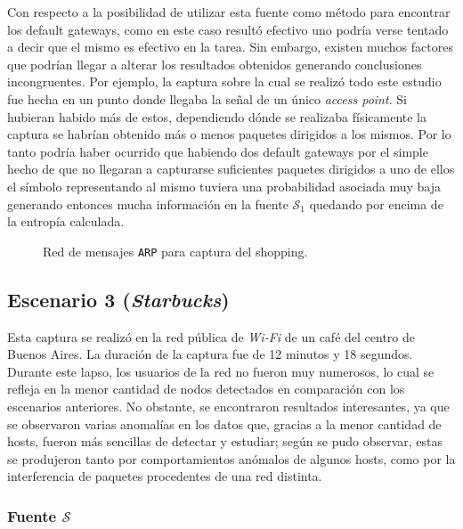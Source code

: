 Con respecto a la posibilidad de utilizar esta fuente como método para encontrar
los default gateways, como en este caso resultó efectivo uno podría verse
tentado a decir que el mismo es efectivo en la tarea. Sin embargo, existen muchos
factores que podrían llegar a alterar los resultados obtenidos generando
conclusiones incongruentes. Por ejemplo, la captura sobre la cual se realizó
todo este estudio fue hecha en un punto donde llegaba la señal de un único
\emph{access point}. Si hubieran habido más de estos, dependiendo dónde se
realizaba físicamente la captura se habrían obtenido más o menos paquetes
dirigidos a los mismos. Por lo tanto podría haber ocurrido que habiendo dos
default gateways por el simple hecho de que no llegaran a capturarse suficientes
paquetes dirigidos a uno de ellos el símbolo representando al mismo tuviera una
probabilidad asociada muy baja generando entonces mucha información en la fuente
$\mathcal{S}_1$ quedando por encima de la entropía calculada.

\begin{figure}[h!]
    \caption{Red de mensajes \texttt{ARP} para captura del shopping.}
    \label{res:esc2:fig3}
\end{figure}

\vfill %

\subsection{Escenario 3 (\emph{Starbucks})}

Esta captura se realizó en la red pública de \emph{Wi-Fi} de un café del centro
de Buenos Aires. La duración de la captura fue de 12 minutos y 18 segundos.
Durante este lapso, los usuarios de la red no fueron muy numerosos, lo cual se
refleja en la menor cantidad de nodos detectados en comparación con los
escenarios anteriores. No obstante, se encontraron resultados interesantes, ya
que se observaron varias anomalías en los datos que, gracias a la menor
cantidad de hosts, fueron más sencillas de detectar y estudiar; según se pudo
observar, estas se produjeron tanto por comportamientos anómalos de algunos
hosts, como por la interferencia de paquetes procedentes de una red distinta.

\subsubsection{Fuente $\mathcal{S}$}

